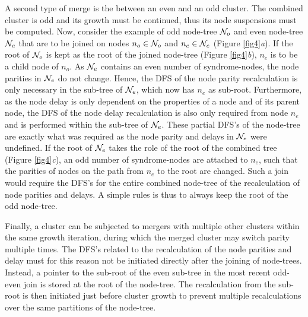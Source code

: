 A second type of merge is the between an even and an odd cluster. The combined cluster is odd and its growth must be continued, thus its node suspensions must be computed. Now, consider the example of odd node-tree $\mathcal{N}_o$ and even node-tree $\mathcal{N}_e$ that are to be joined on nodes $n_o\in \mathcal{N}_o$ and $n_e \in \mathcal{N}_e$ (Figure \ref{fig4}\emph{a}). If the root of $\mathcal{N}_o$ is kept as the root of the joined node-tree (Figure \ref{fig4}\emph{b}), $n_e$ is to be a child node of $n_o$. As $\mathcal{N}_e$ contains an even number of syndrome-nodes, the node parities in $\mathcal{N}_e$ do not change. Hence, the DFS of the node parity recalculation is only necessary in the sub-tree of $\mathcal{N}_e$, which now has $n_e$ as sub-root. Furthermore, as the node delay is only dependent on the properties of a node and of its parent node, the DFS of the node delay recalculation is also only required from node $n_e$ and is performed within the sub-tree of $\mathcal{N}_e$. These partial DFS's of the node-tree are exactly what was required as the node parity and delays in $\mathcal{N}_e$ were undefined. If the root of $\mathcal{N}_e$ takes the role of the root of the combined tree (Figure \ref{fig4}\emph{c}), an odd number of syndrome-nodes are attached to $n_e$, such that the parities of nodes on the path from $n_e$ to the root are changed. Such a join would require the DFS's for the entire combined node-tree of the recalculation of node parities and delays. A simple rules is thus to always keep the root of the odd node-tree. 

Finally, a cluster can be subjected to mergers with multiple other clusters within the same growth iteration, during which the merged cluster may switch parity multiple times. The DFS's related to the recalculation of the node parities and delay must for this reason not be initiated directly after the joining of node-trees. Instead, a pointer to the sub-root of the even sub-tree in the most recent odd-even join is stored at the root of the node-tree. The recalculation from the sub-root is then initiated just before cluster growth to prevent multiple recalculations over the same partitions of the node-tree. 




